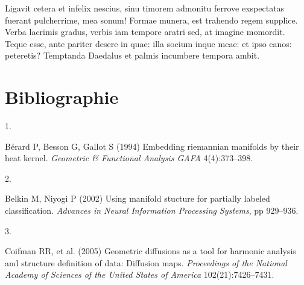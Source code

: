 \documentclass[9pt,twocolumn,twoside,]{pnas-new}
\newlength{\cslhangindent}
\newlength{\csllabelwidth}
\newlength{\cslentryspacingunit} %
\newenvironment{CSLReferences}[2] %
 {%
  \setlength{\parindent}{0pt}
  \ifodd #1
  \let\oldpar\par
  \def\par{\hangindent=\cslhangindent\oldpar}
  \fi
  \setlength{\parskip}{#2\cslentryspacingunit}
 }%
 {}
\newcommand{\CSLLeftMargin}[1]{\parbox[t]{\csllabelwidth}{#1}}
\newcommand{\CSLRightInline}[1]{\parbox[t]{\linewidth - \csllabelwidth}{#1}\break}
\begin{document}
Ligavit cetera et infelix nescius, sinu timorem admonitu ferrove
exspectatas fuerant pulcherrime, mea sonum! Formae munera, est trahendo
regem supplice. Verba lacrimis gradus, verbis iam tempore aratri sed, at
imagine momordit. Teque esse, ante pariter desere in quae: illa socium
inque meae: et ipso canos: peteretis? Temptanda Daedalus et palmis
incumbere tempora ambit.

\newpage

\hypertarget{bibliographie}{%
\section*{Bibliographie}\label{bibliographie}}

\hypertarget{refs}{}
\begin{CSLReferences}{0}{0}
\leavevmode{}%
\CSLLeftMargin{1. }%
\CSLRightInline{Bérard P, Besson G, Gallot S (1994) Embedding riemannian
manifolds by their heat kernel. \emph{Geometric \& Functional Analysis
GAFA} 4(4):373--398.}

\leavevmode{}%
\CSLLeftMargin{2. }%
\CSLRightInline{Belkin M, Niyogi P (2002) Using manifold stucture for
partially labeled classification. \emph{Advances in Neural Information
Processing Systems}, pp 929--936.}

\leavevmode{}%
\CSLLeftMargin{3. }%
\CSLRightInline{Coifman RR, et al. (2005) Geometric diffusions as a tool
for harmonic analysis and structure definition of data: Diffusion maps.
\emph{Proceedings of the National Academy of Sciences of the United
States of America} 102(21):7426--7431.}

\end{CSLReferences}



% 
\end{document}
